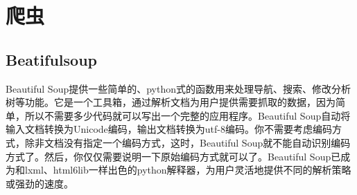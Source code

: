 \section{爬虫}
\subsection*{Beatifulsoup}
Beautiful Soup提供一些简单的、python式的函数用来处理导航、搜索、修改分析树等功能。它是一个工具箱，通过解析文档为用户提供需要抓取的数据，因为简单，所以不需要多少代码就可以写出一个完整的应用程序。Beautiful Soup自动将输入文档转换为Unicode编码，输出文档转换为utf-8编码。你不需要考虑编码方式，除非文档没有指定一个编码方式，这时，Beautiful Soup就不能自动识别编码方式了。然后，你仅仅需要说明一下原始编码方式就可以了。Beautiful Soup已成为和lxml、html6lib一样出色的python解释器，为用户灵活地提供不同的解析策略或强劲的速度。



